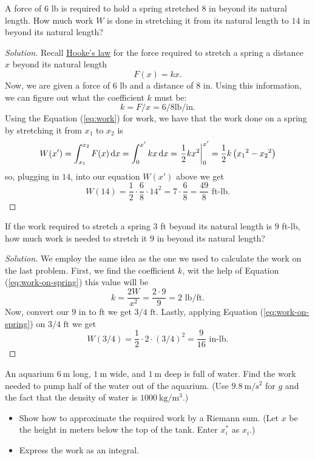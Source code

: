 \begin{problem}[WebAssign, HW8, 3]
A force of $6$ lb is required to hold a spring stretched $8$ in beyond its
natural length. How much work $W$ is done in stretching it from its natural
length to $14$ in beyond its natural length?
\end{problem}
\begin{proof}[Solution]
Recall \href{https://en.wikipedia.org/wiki/Hooke's_law}{Hooke's law} for
the force required to stretch a spring a distance $x$  beyond its natural
length
\begin{equation}
\label{eq:hookes-law}
F(x)=kx.
\end{equation}
Now, we are given a force of $6$ lb and a distance of $8$ in. Using this
information, we can figure out what the coefficient $k$ must be:
\[
k=F/x=6/8\mathrm{lb}/\mathrm{in}.
\]
Using the Equation (\ref{eq:work}) for work, we have that the work done on
a spring by stretching it from $x_1$ to $x_2$ is
\begin{equation}
\label{eq:work-on-spring}
W(x')=\int_{x_1}^{x_2}F(x)\,\mathrm{d} x=\int_0^{x'}kx\,\mathrm{d} x=\left.\frac{1}{2}kx^2\right|_0^{x'}=\frac{1}{2}k\left({x_1}^2-{x_2}^2\right)
\end{equation}
so, plugging in $14$, into our equation $W(x')$ above we get
\[
W(14)=\frac{1}{2}\cdot \frac{6}{8}\cdot
14^2=7\cdot\frac{6}{8}=\boxed{\frac{49}{8}\text{ ft-lb}.}
\]
\end{proof}
\begin{problem}[WebAssign, HW8, 4]
If the work required to stretch a spring $3$ ft beyond its natural length is
$9$ ft-lb, how much work is needed to stretch it $9$ in beyond its natural
length?
\end{problem}
\begin{proof}[Solution]
We employ the same idea as the one we used to calculate the work on the
last problem. First, we find the coefficient $k$, wit the help of Equation
(\ref{eq:work-on-spring}) this value will be
\[
k=\frac{2W}{x^2}=\frac{2\cdot 9}{9}=2\text{ lb}/\text{ft}.
\]
Now, convert our $9\text{ in}$ to ft we get $3/4\text{ ft}$. Lastly,
applying Equation (\ref{eq:work-on-spring}) on $3/4\text{ ft}$ we get
\[
W(3/4)=\frac{1}{2}\cdot 2\cdot (3/4)^2=\boxed{\frac{9}{16}\text{ in-lb}.}
\]
\end{proof}
\begin{problem}[WebAssign, HW8, 5]
An aquarium $\SI{6}{\meter}$ long, $\SI{1}{\meter}$ wide, and
$\SI{1}{\meter}$ deep is full of water. Find the work needed to pump half
of the water out of the aquarium. (Use $\SI{9.8}{\meter/\second^2}$ for $g$
and the fact that the density of water is
$\SI{1000}{\kilo\gram/\meter^3}$.)
\begin{itemize}
\item Show how to approximate the required work by a Riemann sum. (Let $x$
  be the height in meters below the top of the tank. Enter $x_i^*$ as $x_i$.)
\item Express the work as an integral.
\end{itemize}
\end{problem}
